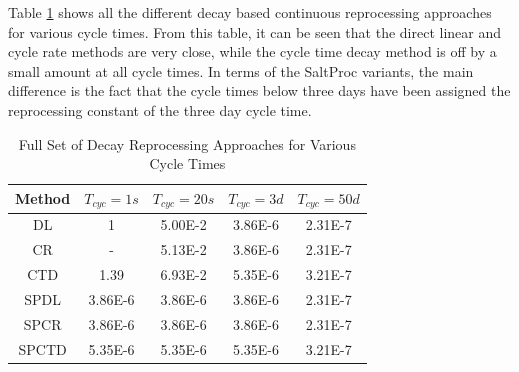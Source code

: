 Table \ref{tab:repr_decay_view_full} shows all the different decay based continuous reprocessing approaches for various cycle times. From this table, it can be seen that the direct linear and cycle rate methods are very close, while the cycle time decay method is off by a small amount at all cycle times. In terms of the SaltProc variants, the main difference is the fact that the cycle times below three days have been assigned the reprocessing constant of the three day cycle time.

\begin{table}[H]
\renewcommand{\arraystretch}{1.25}
\caption{Full Set of Decay Reprocessing Approaches for Various Cycle Times}
\label{tab:repr_decay_view_full}
\begin{center}
\begin{tabular}{ | c | c | c | c | c | }
 \hline
 Method & $T_{cyc} = 1 s$ & $T_{cyc} = 20 s$ & $T_{cyc} = 3 d$ & $T_{cyc} = 50 d$\\
 \hline
 \hline
 DL & 1 & 5.00E-2 & 3.86E-6 & 2.31E-7\\
 CR & - & 5.13E-2 & 3.86E-6 & 2.31E-7\\
 CTD & 1.39 & 6.93E-2 & 5.35E-6 & 3.21E-7\\
 \hline
 SPDL & 3.86E-6 & 3.86E-6 & 3.86E-6 & 2.31E-7\\
 SPCR & 3.86E-6 & 3.86E-6 & 3.86E-6 & 2.31E-7\\
 SPCTD & 5.35E-6 & 5.35E-6 & 5.35E-6 & 3.21E-7\\
 \hline
\end{tabular}
\end{center}
\end{table}





